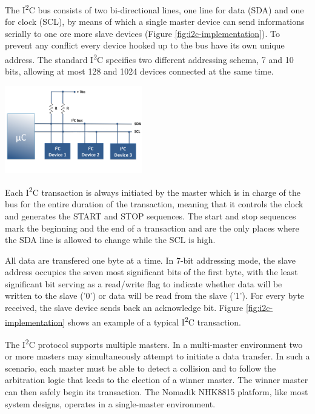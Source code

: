 \documentclass[a4paper,10pt]{article}
\makeatletter
\newenvironment{figurehere}{\def\@captype{figure}\vspace{2ex}}{\vspace{2ex}}
\newcommand{\icc}{I\textsuperscript{2}C }
\makeatother
\begin{document}
\begin{multicols}{2}
The \icc bus consists of two bi-directional lines, one line for data (SDA)
and one for clock (SCL), by means of which a single master device can send
informations serially to one ore more slave devices (Figure
\ref{fig:i2c-implementation}).
To prevent any conflict every device hooked up to the bus have its own unique
address. The standard \icc specifies two different addressing schema, 7 and
10 bits, allowing at most 128 and 1024 devices connected at the same time.

\begin{figurehere}
 \centering
 \includegraphics[width=6cm, height=3.8cm]{./figures/i2c-diagram.png}
 \caption{Sample \icc implementation (adapted from \emph{embedded-lab.com}).}
 \label{fig:i2c-implementation}
\end{figurehere}

Each \icc transaction is always initiated by the master which is in charge of
the bus for the entire duration of the transaction, meaning that it controls the
clock and generates the START and STOP sequences. The start and stop sequences
mark the beginning and the end of a transaction and are the only places where
the SDA line is allowed to change while the SCL is high.

All data are transfered one byte at a time. In 7-bit addressing mode, the slave
address occupies the seven most significant bits of the first byte, with the
least significant bit serving as a read/write flag to indicate whether data
will be written to the slave ('0') or data will be read from the slave ('1').
For every byte received, the slave device sends back an acknowledge bit.
Figure \ref{fig:i2c-implementation} shows an example of a typical \icc
transaction.

The \icc protocol supports multiple masters. In a multi-master environment two
or more masters may simultaneously attempt to initiate a data transfer.
In such a scenario, each master must be able to detect a collision and to follow
the arbitration logic that leeds to the election of a winner master. The winner
master can then safely begin its transaction.
The Nomadik NHK8815 platform, like most system designs, operates in a 
single-master environment.


\end{multicols}
\end{document}

